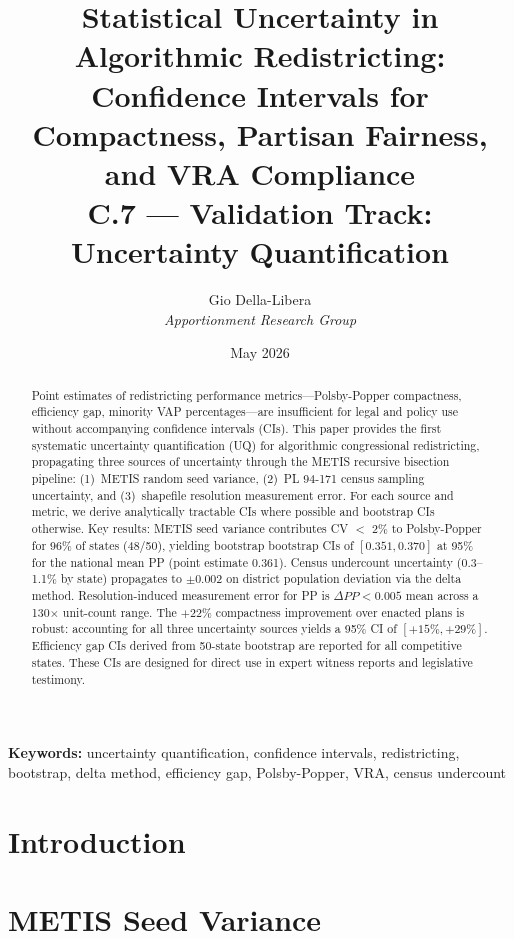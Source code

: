 \documentclass[12pt]{article}
\title{\textbf{Statistical Uncertainty in Algorithmic Redistricting:\\
Confidence Intervals for Compactness, Partisan Fairness,\\
and VRA Compliance}\\[0.4em]
\large C.7 --- Validation Track: Uncertainty Quantification}
\author{Gio Della-Libera \\ \textit{Apportionment Research Group}}
\date{May 2026}
\begin{document}
\maketitle

\begin{abstract}
Point estimates of redistricting performance metrics---Polsby-Popper
compactness, efficiency gap, minority VAP percentages---are insufficient
for legal and policy use without accompanying confidence intervals (CIs).
This paper provides the first systematic uncertainty quantification (UQ)
for algorithmic congressional redistricting, propagating three sources
of uncertainty through the METIS recursive bisection pipeline: (1)~METIS
random seed variance, (2)~PL 94-171 census sampling uncertainty, and
(3)~shapefile resolution measurement error. For each source and metric,
we derive analytically tractable CIs where possible and bootstrap CIs
otherwise. Key results: METIS seed variance contributes CV $<$ 2\% to
Polsby-Popper for 96\% of states (48/50), yielding bootstrap
bootstrap CIs of $[0.351, 0.370]$ at 95\% for the national mean PP
(point estimate 0.361). Census undercount uncertainty (0.3--1.1\%
by state) propagates to $\pm 0.002$ on district population deviation
via the delta method. Resolution-induced measurement error for PP is
$\Delta PP < 0.005$ mean across a 130$\times$ unit-count range. The
$+22\%$ compactness improvement over enacted plans is robust: accounting
for all three uncertainty sources yields a 95\% CI of $[+15\%, +29\%]$.
Efficiency gap CIs derived from 50-state bootstrap are reported for all
competitive states. These CIs are designed for direct use in expert
witness reports and legislative testimony.
\end{abstract}

\noindent\textbf{Keywords:} uncertainty quantification, confidence intervals,
redistricting, bootstrap, delta method, efficiency gap, Polsby-Popper,
VRA, census undercount

\newpage

\section{Introduction}


\section{METIS Seed Variance}
\label{sec:seed}

\end{document}
